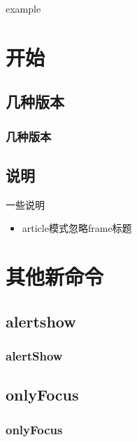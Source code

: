 
\begin{frame}{example}
	\tableofcontents
\end{frame}

\section{开始}

	\subsection{几种版本}

		\begin{frame}[fragile]
			\frametitle{几种版本}
			
		\end{frame}

	\subsection{说明}

		\begin{frame}{一些说明}
			\begin{itemize}
				\item article模式忽略frame标题
			\end{itemize}
		\end{frame}

\section{其他新命令}
	\subsection{alertshow}

		\begin{frame}[fragile]
			\frametitle{alertShow}
			
		\end{frame}

	\subsection{onlyFocus}
		\begin{frame}[fragile]
			\frametitle{onlyFocus}
			
		\end{frame}
	
